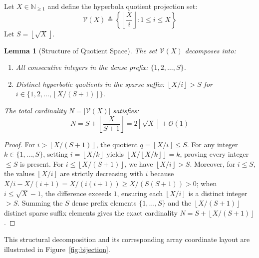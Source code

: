 \documentclass[11pt,a4paper]{article}
\theoremstyle{plain}
\newtheorem{lemma}[theorem]{Lemma}
\theoremstyle{definition}
\newcommand{\N}{\mathbb{N}}
\newcommand{\V}{\mathcal{V}}
\newcommand{\Oh}{\mathcal{O}}
\newcommand{\floor}[1]{\left\lfloor #1 \right\rfloor}
\newcommand{\abs}[1]{\left| #1 \right|}
\begin{document}
Let $X \in \N_{\ge 1}$ and define the hyperbola quotient projection set:
\begin{equation}
    \V(X) \triangleq \left\{ \floor{\frac{X}{i}} : 1 \le i \le X \right\}
\end{equation}
Let $S = \floor{\sqrt{X}}$.

\begin{lemma}[Structure of Quotient Space]
\label{lem:structure}
The set $\V(X)$ decomposes into:
\begin{enumerate}
    \item All consecutive integers in the dense prefix: $\{1, 2, \dots, S\}$.
    \item Distinct hyperbolic quotients in the sparse suffix: $\floor{X/i} > S$ for $i \in \{1, 2, \dots, \floor{X/(S+1)}\}$.
\end{enumerate}
The total cardinality $N = \abs{\V(X)}$ satisfies:
\begin{equation}
    N = S + \floor{\frac{X}{S+1}} = 2\floor{\sqrt{X}} + \Oh(1)
\end{equation}
\end{lemma}

\begin{proof}
For $i > \floor{X/(S+1)}$, the quotient $q = \floor{X/i} \le S$. For any integer $k \in \{1, \dots, S\}$, setting $i = \floor{X/k}$ yields $\floor{X/\floor{X/k}} = k$, proving every integer $\le S$ is present. For $i \le \floor{X/(S+1)}$, we have $\floor{X/i} > S$. Moreover, for $i \le S$, the values $\floor{X/i}$ are strictly decreasing with $i$ because $X/i - X/(i+1) = X/(i(i+1)) \ge X/(S(S+1)) > 0$; when $i \le \sqrt{X}-1$, the difference exceeds $1$, ensuring each $\floor{X/i}$ is a distinct integer $> S$. Summing the $S$ dense prefix elements $\{1, \dots, S\}$ and the $\floor{X/(S+1)}$ distinct sparse suffix elements gives the exact cardinality $N = S + \floor{X/(S+1)}$.
\end{proof}

This structural decomposition and its corresponding array coordinate layout are illustrated in Figure~\ref{fig:bijection}.
\end{document}

